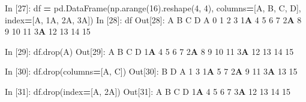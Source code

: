 \documentclass[
]{book}
\newenvironment{Shaded}{\begin{snugshade}}{\end{snugshade}}
\newcommand{\DecValTok}[1]{\textcolor[rgb]{0.00,0.00,0.81}{#1}}
\newcommand{\ErrorTok}[1]{\textcolor[rgb]{0.64,0.00,0.00}{\textbf{#1}}}
\newcommand{\NormalTok}[1]{#1}
\newcommand{\OperatorTok}[1]{\textcolor[rgb]{0.81,0.36,0.00}{\textbf{#1}}}
\newcommand{\StringTok}[1]{\textcolor[rgb]{0.31,0.60,0.02}{#1}}
\begin{document}
\begin{Shaded}
\begin{Highlighting}[]
\NormalTok{In [}\DecValTok{27}\NormalTok{]: df }\OperatorTok{=}\NormalTok{ pd.DataFrame(np.arange(}\DecValTok{16}\NormalTok{).reshape(}\DecValTok{4}\NormalTok{, }\DecValTok{4}\NormalTok{),}
\NormalTok{                  columns}\OperatorTok{=}\NormalTok{[}\StringTok{\textquotesingle{}A\textquotesingle{}}\NormalTok{, }\StringTok{\textquotesingle{}B\textquotesingle{}}\NormalTok{, }\StringTok{\textquotesingle{}C\textquotesingle{}}\NormalTok{, }\StringTok{\textquotesingle{}D\textquotesingle{}}\NormalTok{],}
\NormalTok{                  index}\OperatorTok{=}\NormalTok{[}\StringTok{\textquotesingle{}A\textquotesingle{}}\NormalTok{, }\StringTok{\textquotesingle{}1A\textquotesingle{}}\NormalTok{, }\StringTok{\textquotesingle{}2A\textquotesingle{}}\NormalTok{, }\StringTok{\textquotesingle{}3A\textquotesingle{}}\NormalTok{])}
\NormalTok{In [}\DecValTok{28}\NormalTok{]: df}
\NormalTok{Out[}\DecValTok{28}\NormalTok{]:}
\NormalTok{     A   B   C   D}
\NormalTok{A    }\DecValTok{0}   \DecValTok{1}   \DecValTok{2}   \DecValTok{3}
\DecValTok{1}\ErrorTok{A}   \DecValTok{4}   \DecValTok{5}   \DecValTok{6}   \DecValTok{7}
\DecValTok{2}\ErrorTok{A}   \DecValTok{8}   \DecValTok{9}  \DecValTok{10}  \DecValTok{11}
\DecValTok{3}\ErrorTok{A}  \DecValTok{12}  \DecValTok{13}  \DecValTok{14}  \DecValTok{15}

\NormalTok{In [}\DecValTok{29}\NormalTok{]: df.drop(}\StringTok{\textquotesingle{}A\textquotesingle{}}\NormalTok{)}
\NormalTok{Out[}\DecValTok{29}\NormalTok{]:}
\NormalTok{    A   B   C   D}
\DecValTok{1}\ErrorTok{A}  \DecValTok{4}   \DecValTok{5}   \DecValTok{6}   \DecValTok{7}
\DecValTok{2}\ErrorTok{A}  \DecValTok{8}   \DecValTok{9}   \DecValTok{10}  \DecValTok{11}
\DecValTok{3}\ErrorTok{A}  \DecValTok{12}  \DecValTok{13}  \DecValTok{14}  \DecValTok{15}

\NormalTok{In [}\DecValTok{30}\NormalTok{]: df.drop(columns}\OperatorTok{=}\NormalTok{[}\StringTok{\textquotesingle{}A\textquotesingle{}}\NormalTok{, }\StringTok{\textquotesingle{}C\textquotesingle{}}\NormalTok{])}
\NormalTok{Out[}\DecValTok{30}\NormalTok{]: }
\NormalTok{     B   D}
\NormalTok{A    }\DecValTok{1}   \DecValTok{3}
\DecValTok{1}\ErrorTok{A}   \DecValTok{5}   \DecValTok{7}
\DecValTok{2}\ErrorTok{A}   \DecValTok{9}  \DecValTok{11}
\DecValTok{3}\ErrorTok{A}  \DecValTok{13}  \DecValTok{15}

\NormalTok{In [}\DecValTok{31}\NormalTok{]: df.drop(index}\OperatorTok{=}\NormalTok{[}\StringTok{\textquotesingle{}A\textquotesingle{}}\NormalTok{, }\StringTok{\textquotesingle{}2A\textquotesingle{}}\NormalTok{])}
\NormalTok{Out[}\DecValTok{31}\NormalTok{]: }
\NormalTok{     A   B   C   D}
\DecValTok{1}\ErrorTok{A}   \DecValTok{4}   \DecValTok{5}   \DecValTok{6}   \DecValTok{7}
\DecValTok{3}\ErrorTok{A}  \DecValTok{12}  \DecValTok{13}  \DecValTok{14}  \DecValTok{15}
\end{Highlighting}
\end{Shaded}
\end{document}
